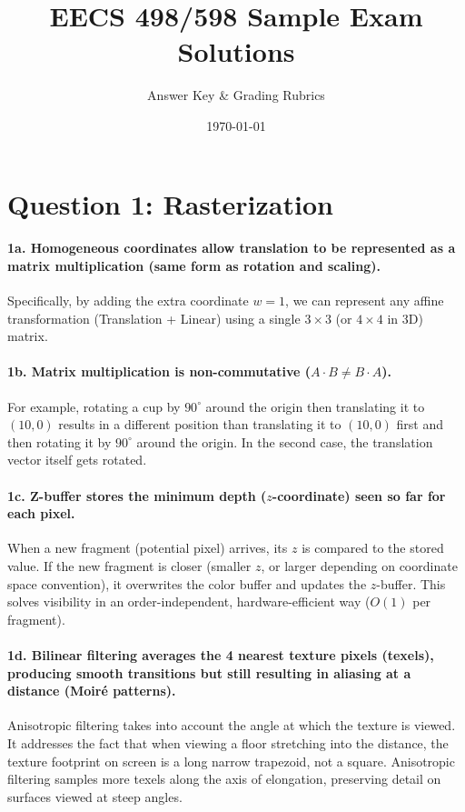 \documentclass[11pt]{article}
\title{\textbf{\color{red!70!black}EECS 498/598 Sample Exam Solutions}}
\author{Answer Key \& Grading Rubrics}
\date{\today}
\begin{document}
\maketitle

\section*{Question 1: Rasterization}

\paragraph{1a. Homogeneous coordinates allow translation to be represented as a matrix multiplication (same form as rotation and scaling).} Specifically, by adding the extra coordinate $w=1$, we can represent any affine transformation (Translation + Linear) using a single $3\times3$ (or $4\times4$ in 3D) matrix.

\paragraph{1b. Matrix multiplication is non-commutative ($A \cdot B \neq B \cdot A$).} For example, rotating a cup by $90^\circ$ around the origin then translating it to $(10,0)$ results in a different position than translating it to $(10,0)$ first and then rotating it by $90^\circ$ around the origin. In the second case, the translation vector itself gets rotated.

\paragraph{1c. Z-buffer stores the minimum depth ($z$-coordinate) seen so far for each pixel.} When a new fragment (potential pixel) arrives, its $z$ is compared to the stored value. If the new fragment is closer (smaller $z$, or larger depending on coordinate space convention), it overwrites the color buffer and updates the $z$-buffer. This solves visibility in an order-independent, hardware-efficient way ($O(1)$ per fragment).

\paragraph{1d. Bilinear filtering averages the 4 nearest texture pixels (texels), producing smooth transitions but still resulting in aliasing at a distance (Moiré patterns).} Anisotropic filtering takes into account the angle at which the texture is viewed. It addresses the fact that when viewing a floor stretching into the distance, the texture footprint on screen is a long narrow trapezoid, not a square. Anisotropic filtering samples more texels along the axis of elongation, preserving detail on surfaces viewed at steep angles.
\end{document}
